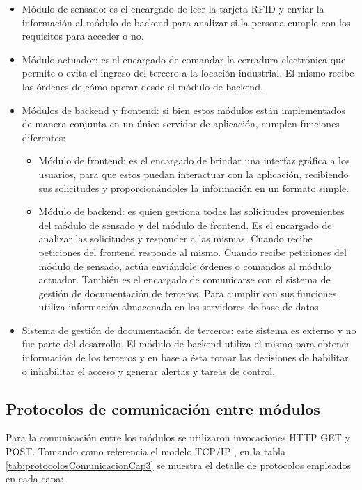 \begin{itemize}
\item Módulo de sensado: es el encargado de leer la tarjeta RFID y enviar la información al módulo de backend para analizar si la persona cumple con los requisitos para acceder o no.
\item Módulo actuador: es el encargado de comandar la cerradura electrónica que permite o evita el ingreso del tercero a la locación industrial. El mismo recibe las órdenes de cómo operar desde el módulo de backend.
\item Módulos de backend y frontend: si bien estos módulos están implementados de manera conjunta en un único servidor de aplicación, cumplen funciones diferentes:

	\begin{itemize}
	\item Módulo de frontend: es el encargado de brindar una interfaz gráfica a los usuarios, para que estos puedan interactuar con la aplicación, recibiendo sus solicitudes y proporcionándoles la información en un formato simple.
	\item Módulo de backend: es quien gestiona todas las solicitudes provenientes del módulo de sensado y del módulo de frontend. Es el encargado de analizar las solicitudes y responder a las mismas. Cuando recibe peticiones del frontend responde al mismo. Cuando recibe peticiones del módulo de sensado, actúa enviándole órdenes o comandos al módulo actuador. También es el encargado de comunicarse con el sistema de gestión de documentación de terceros. Para cumplir con sus funciones utiliza información almacenada en los servidores de base de datos.
	\end{itemize}
\item Sistema de gestión de documentación de terceros: este sistema es externo y no fue parte del desarrollo. El módulo de backend utiliza el mismo para obtener información de los terceros y en base a ésta tomar las decisiones de habilitar o inhabilitar el acceso y generar alertas y tareas de control.
\end{itemize}

\subsection{Protocolos de comunicación entre módulos}
Para la comunicación entre los módulos se utilizaron invocaciones HTTP GET y POST. 
Tomando como referencia el modelo TCP/IP \citep{WEBSITE:modeloTCPIP}, en la tabla \ref{tab:protocolosComunicacionCap3} se muestra el detalle de protocolos empleados en cada capa:


